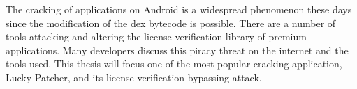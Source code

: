 The cracking of applications on Android is a widespread phenomenon these days since the modification of the dex bytecode is possible.
There are a number of tools attacking and altering the license verification library of premium applications.
Many developers discuss this piracy threat on the internet and the tools used.
\newline
This thesis will focus one of the most popular cracking application, Lucky Patcher, and its license verification bypassing attack.
